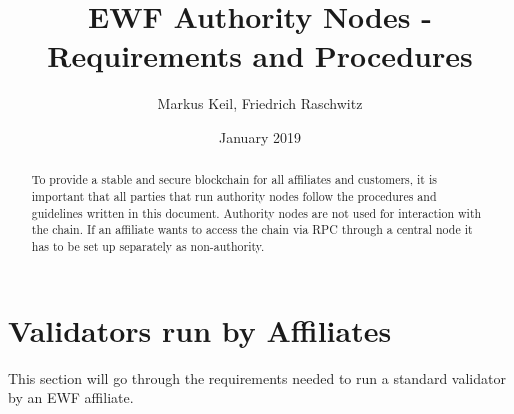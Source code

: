 \documentclass[11pt,a4paper,titlepage]{article}
\begin{document}
\title{EWF Authority Nodes - Requirements and Procedures}
\author{Markus Keil, Friedrich Raschwitz}
\date{January 2019}

\maketitle

\begin{abstract}
To provide a stable and secure blockchain for all affiliates and customers, it is important that all parties that run authority nodes follow the procedures and guidelines written in this document.
Authority nodes are not used for interaction with the chain. If an affiliate wants to access the chain via RPC through a central node it has to be set up separately as non-authority.
\end{abstract}

\tableofcontents

\newpage

\newpage

\newpage

\newpage

\newpage

\newpage

\newpage

\section{Validators run by Affiliates}

This section will go through the requirements needed to run a standard validator by an EWF affiliate.






%
\newpage



\newpage

\newpage


\newpage

\newpage

\end{document}
